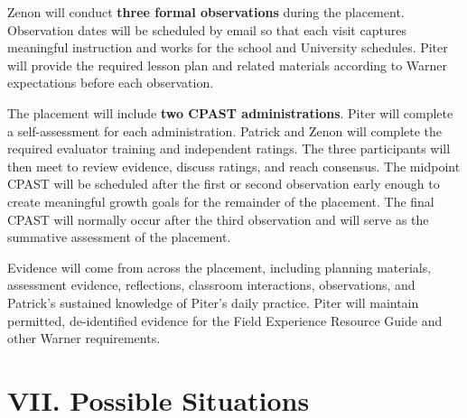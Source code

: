 \documentclass[10pt]{article}
\begin{document}
Zenon will conduct \textbf{three formal observations} during the placement. Observation dates will be scheduled by email so that each visit captures meaningful instruction and works for the school and University schedules. Piter will provide the required lesson plan and related materials according to Warner expectations before each observation.

The placement will include \textbf{two CPAST administrations}. Piter will complete a self-assessment for each administration. Patrick and Zenon will complete the required evaluator training and independent ratings. The three participants will then meet to review evidence, discuss ratings, and reach consensus. The midpoint CPAST will be scheduled after the first or second observation early enough to create meaningful growth goals for the remainder of the placement. The final CPAST will normally occur after the third observation and will serve as the summative assessment of the placement.

Evidence will come from across the placement, including planning materials, assessment evidence, reflections, classroom interactions, observations, and Patrick's sustained knowledge of Piter's daily practice. Piter will maintain permitted, de-identified evidence for the Field Experience Resource Guide and other Warner requirements.

\section*{VII. Possible Situations}
\end{document}
